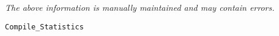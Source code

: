 \label{pkg:compile\_statistics}

{\tiny \it The above information is manually maintained and may contain errors.}
\begin{verbatim}
Compile_Statistics
\end{verbatim}

